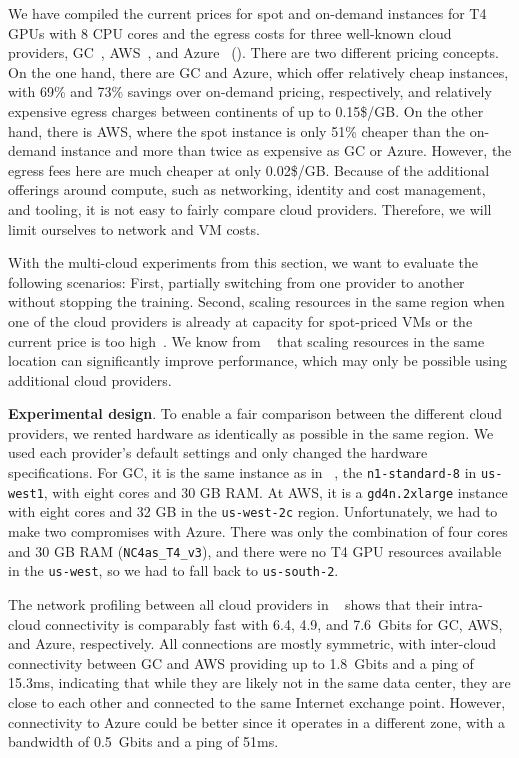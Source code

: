 We have compiled the current prices for spot and on-demand instances for T4 GPUs with 8 CPU cores and the egress costs for three well-known cloud providers, GC~\cite{gcweb}, AWS~\cite{awsweb}, and Azure~\cite{azureweb} ().
There are two different pricing concepts. 
On the one hand, there are GC and Azure, which offer relatively cheap instances, with 69\% and 73\% savings over on-demand pricing, respectively, and relatively expensive egress charges between continents of up to 0.15\$/GB.
On the other hand, there is AWS, where the spot instance is only 51\% cheaper than the on-demand instance and more than twice as expensive as GC or Azure. 
However, the egress fees here are much cheaper at only 0.02\$/GB.
Because of the additional offerings around compute, such as networking, identity and cost management, and tooling, it is not easy to fairly compare cloud providers. Therefore, we will limit ourselves to network and VM costs.

With the multi-cloud experiments from this section, we want to evaluate the following scenarios:
First, partially switching from one provider to another without stopping the training.
Second, scaling resources in the same region when one of the cloud providers is already at capacity for spot-priced VMs or the current price is too high~\cite{9975369}. We know from ~ that scaling resources in the same location can significantly improve performance, which may only be possible using additional cloud providers. 

\textbf{Experimental design}. To enable a fair comparison between the different cloud providers, we rented hardware as identically as possible in the same region.
We used each provider's default settings and only changed the hardware specifications.
For GC, it is the same instance as in ~, the \texttt{n1-standard-8} in \texttt{us-west1}, with eight cores and 30 GB RAM. At AWS, it is a \texttt{gd4n.2xlarge} instance with eight cores and 32 GB in the \texttt{us-west-2c} region.
Unfortunately, we had to make two compromises with Azure.
There was only the combination of four cores and 30 GB RAM (\texttt{NC4as\_T4\_v3}), and there were no T4 GPU resources available in the \texttt{us-west}, so we had to fall back to \texttt{us-south-2}.
 
The network profiling between all cloud providers in ~ shows that their intra-cloud connectivity is comparably fast with 6.4, 4.9, and 7.6~Gbits for GC, AWS, and Azure, respectively.
All connections are mostly symmetric, with inter-cloud connectivity between GC and AWS providing up to 1.8~Gbits and a ping of 15.3ms, indicating that while they are likely not in the same data center, they are close to each other and connected to the same Internet exchange point.
However, connectivity to Azure could be better since it operates in a different zone, with a bandwidth of 0.5~Gbits and a ping of 51ms.

